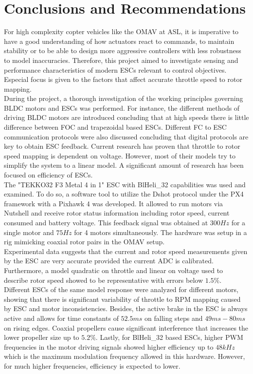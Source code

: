 \chapter{Conclusions and Recommendations}

For high complexity copter vehicles like the OMAV at ASL, it is imperative to have a good understanding of how actuators react to commands, to maintain stability or to be able to design more aggressive controllers with less robustness to model inaccuracies. Therefore, this project aimed to investigate sensing and performance characteristics of modern ESCs relevant to control objectives. Especial focus is given to the factors that affect accurate throttle speed to rotor mapping.\\

During the project, a thorough investigation of the working principles governing BLDC motors and ESCs was performed. For instance, the different methods of driving BLDC motors are introduced concluding that at high speeds there is little difference between FOC and trapezoidal based ESCs. Different FC to ESC communication protocols were also discussed concluding that digital protocols are key to obtain ESC feedback. Current research has proven that throttle to rotor speed mapping is dependent on voltage. However, most of their models try to simplify the system to a linear  model. A significant amount of research has been focused on efficiency of ESCs.\\

The "TEKKO32 F3 Metal 4 in 1" ESC with BlHeli\_32 capabilities was used and examined. To do so,  a software tool to utilize the Dshot protocol under the PX4 framework with a Pixhawk 4 was developed. It allowed to run motors via Nutshell and receive rotor status information including rotor speed, current consumed and battery voltage. This feedback signal was obtained at $300Hz$ for a single motor and $75Hz$ for 4 motors simultaneously. The hardware was setup in a rig mimicking coaxial rotor pairs in the OMAV setup.\\

Experimental data suggests that the current and rotor speed measurements given by the ESC are very accurate provided the current ADC is calibrated. Furthermore, a model quadratic on throttle and linear on voltage used to describe rotor speed showed to be representative with errors below $1.5\%$. Different ESCs of the same model response were analyzed for different motors, showing that there is significant variability of throttle to RPM mapping caused by ESC and motor inconsistencies.
Besides, the active brake in the ESC is always active and allows for time constants of $52.5ms$ on falling steps and $49ms-80ms$ on rising edges. Coaxial propellers cause significant interference that increases the lower propeller size up to  $5.2\%$. Lastly, for BlHeli\_32 based ESCs, higher PWM frequencies in the motor driving signals showed higher efficiency up to $48kHz$ which is the maximum modulation frequency allowed in this hardware. However, for much higher frequencies, efficiency is expected to lower.\\

